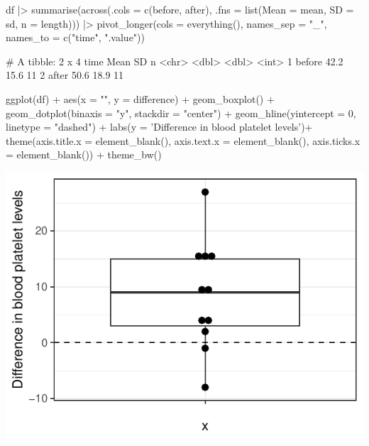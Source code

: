 \documentclass[a4paper]{article}\usepackage[]{graphicx}\usepackage[]{xcolor}
\makeatletter
\def\maxwidth{ %
  \ifdim\Gin@nat@width>\linewidth
    \linewidth
  \else
    \Gin@nat@width
  \fi
}
\makeatother
\begin{document}
\begin{Schunk}
\begin{Sinput}
df |>
summarise(across(.cols = c(before, after), 
  .fns = list(Mean = mean, 
  SD = sd, 
  n = length))) |> 
pivot_longer(cols = everything(),
  names_sep = "_",
  names_to = c("time", ".value"))
\end{Sinput}
\begin{Soutput}
# A tibble: 2 x 4
  time    Mean    SD     n
  <chr>  <dbl> <dbl> <int>
1 before  42.2  15.6    11
2 after   50.6  18.9    11
\end{Soutput}
\begin{Sinput}
ggplot(df) +
aes(x = "", y = difference) + 
geom_boxplot() +
geom_dotplot(binaxis = "y", stackdir = "center") +
geom_hline(yintercept = 0, linetype = "dashed") +
labs(y = 'Difference in blood platelet levels')+
theme(axis.title.x = element_blank(),
  axis.text.x = element_blank(),
  axis.ticks.x = element_blank()) + 
theme_bw()
\end{Sinput}


{\centering \includegraphics[width=\maxwidth]{figure/listings-unnamed-chunk-66-1} 

}

\end{Schunk}
\end{document}

